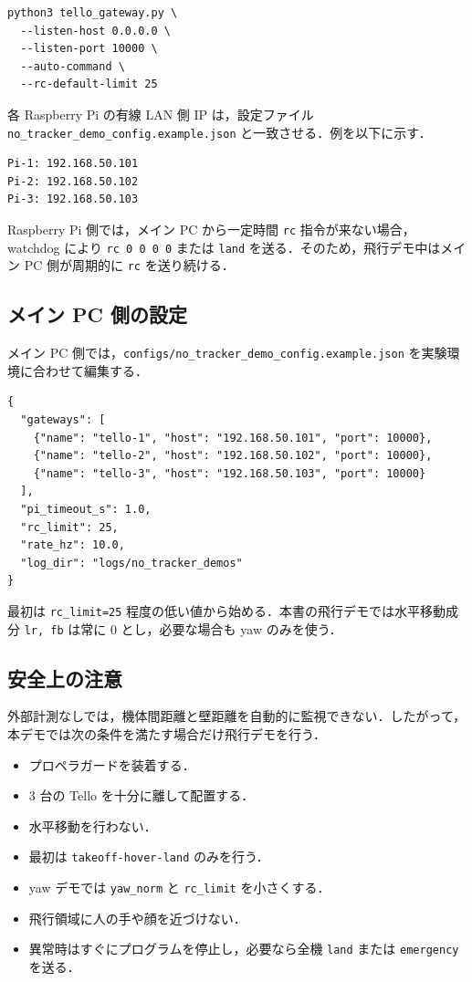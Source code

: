 \begin{lstlisting}
python3 tello_gateway.py \
  --listen-host 0.0.0.0 \
  --listen-port 10000 \
  --auto-command \
  --rc-default-limit 25
\end{lstlisting}

各 Raspberry Pi の有線 LAN 側 IP は，設定ファイル \texttt{no\_tracker\_demo\_config.example.json} と一致させる．例を以下に示す．

\begin{lstlisting}
Pi-1: 192.168.50.101
Pi-2: 192.168.50.102
Pi-3: 192.168.50.103
\end{lstlisting}

Raspberry Pi 側では，メイン PC から一定時間 \texttt{rc} 指令が来ない場合，watchdog により \texttt{rc 0 0 0 0} または \texttt{land} を送る．そのため，飛行デモ中はメイン PC 側が周期的に \texttt{rc} を送り続ける．

\subsection{メイン PC 側の設定}

メイン PC 側では，\texttt{configs/no\_tracker\_demo\_config.example.json} を実験環境に合わせて編集する．

\begin{lstlisting}[language={}]
{
  "gateways": [
    {"name": "tello-1", "host": "192.168.50.101", "port": 10000},
    {"name": "tello-2", "host": "192.168.50.102", "port": 10000},
    {"name": "tello-3", "host": "192.168.50.103", "port": 10000}
  ],
  "pi_timeout_s": 1.0,
  "rc_limit": 25,
  "rate_hz": 10.0,
  "log_dir": "logs/no_tracker_demos"
}
\end{lstlisting}

最初は \texttt{rc\_limit=25} 程度の低い値から始める．本書の飛行デモでは水平移動成分 \texttt{lr, fb} は常に 0 とし，必要な場合も yaw のみを使う．

\subsection{安全上の注意}

外部計測なしでは，機体間距離と壁距離を自動的に監視できない．したがって，本デモでは次の条件を満たす場合だけ飛行デモを行う．

\begin{itemize}
  \item プロペラガードを装着する．
  \item 3 台の Tello を十分に離して配置する．
  \item 水平移動を行わない．
  \item 最初は \texttt{takeoff-hover-land} のみを行う．
  \item yaw デモでは \texttt{yaw\_norm} と \texttt{rc\_limit} を小さくする．
  \item 飛行領域に人の手や顔を近づけない．
  \item 異常時はすぐにプログラムを停止し，必要なら全機 \texttt{land} または \texttt{emergency} を送る．
\end{itemize}

